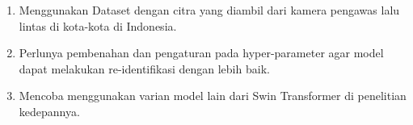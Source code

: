 \begin{enumerate}[nolistsep]

  \item Menggunakan Dataset dengan citra yang diambil dari kamera pengawas lalu lintas di 
  kota-kota di Indonesia.


  \item Perlunya pembenahan dan pengaturan pada hyper-parameter agar model dapat melakukan 
  re-identifikasi dengan lebih baik.

  \item Mencoba menggunakan varian model lain dari Swin Transformer di penelitian kedepannya.

\end{enumerate}
